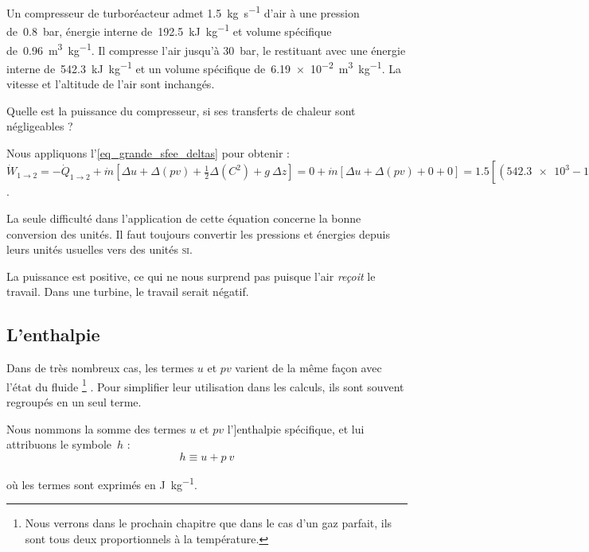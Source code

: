 		\begin{anexample}
			Un compresseur de turboréacteur admet \SI{1,5}{\kilogram\per\second} d’air à une pression de~\SI{0,8}{\bar}, énergie interne de~\SI{192,5}{\kilo\joule\per\kilogram} et volume spécifique de~\SI{0,96}{\metre\cubed\per\kilogram}. Il compresse l’air jusqu’à \SI{30}{\bar}, le restituant avec une énergie interne de~\SI{542,3}{\kilo\joule\per\kilogram} et un volume spécifique de~\SI{6,19e-2}{\metre\cubed\per\kilogram}. La vitesse et l’altitude de l’air sont inchangés.
			
			Quelle est la puissance du compresseur, si ses transferts de chaleur sont négligeables ?
				\begin{answer}
					Nous appliquons l’\cref{eq_grande_sfee_deltas} pour obtenir :  $\dot{W}_{1 \to 2}
					= -\dot{Q}_{1 \to 2} + \dot{m} \left[ \Delta u + \Delta (p v) + \frac{1}{2} \Delta \left(C^2\right) + g \ \Delta z \right]
					= 0 + \dot{m} \left[ \Delta u + \Delta (p v) + 0 + 0 \right]
					= \num{1,5} \left[ (\num{542,3e3} - \num{192,5e3}) + (\num{30e5}\times\num{6,19e-2} - \num{0,8e5}\times\num{0,96})\right]
					= \SI{+6,881e5}{\watt} = \SI{+688,1}{\kilo\watt}$.
					\begin{remark}La seule difficulté dans l’application de cette équation concerne la bonne conversion des unités. Il faut toujours convertir les pressions et énergies depuis leurs unités usuelles vers des unités \textsc{si}.\end{remark}
					\begin{remark}La puissance est positive, ce qui ne nous surprend pas puisque l’air \emph{reçoit} le travail. Dans une turbine, le travail serait négatif.\end{remark}
				\end{answer}
		\end{anexample}

	\subsection{L’enthalpie}

		Dans de très nombreux cas, les termes $u$ et $p v$ varient de la même façon avec l’état du fluide%
			\footnote{Nous verrons dans le prochain chapitre que dans le cas d’un gaz parfait, ils sont tous deux proportionnels à la température.}%
		. Pour simplifier leur utilisation dans les calculs, ils sont souvent regroupés en un seul terme.

		Nous nommons la somme des termes $u$ et $p v$ l’]{enthalpie spécifique}, et lui attribuons le symbole~$h$ :
		\begin{equation}
			h \equiv u + p \ v
			\label{def_enthalpie}
		\end{equation}
		\begin{equationterms}
			\item où les termes sont exprimés en \si{\joule\per\kilogram}.
		\end{equationterms}

